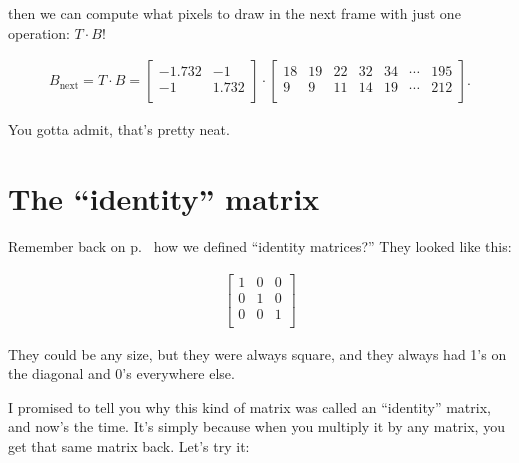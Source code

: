 then we can compute what pixels to draw in the next frame with just one
operation: $T \cdot B$!

\vspace{-.15in}
\begin{align*}
B_{\text{next}} = T \cdot B =
\begin{bmatrix}
-1.732 & -1 \\
-1 & 1.732 \\
\end{bmatrix} \cdot
\begin{bmatrix}
18 & 19 & 22 & 32 & 34 & \cdots & 195 \\
9 & 9 & 11 & 14 & 19 & \cdots & 212 \\
\end{bmatrix}.
\end{align*}
\vspace{-.15in}

You gotta admit, that's pretty neat.


\pagebreak

\section{The ``identity'' matrix}

\label{identityMatrixExplanation}

Remember back on p.~\pageref{identityMatrix} how we defined ``identity
matrices?'' They looked like this:

\vspace{-.15in}
\begin{align*}
\begin{bmatrix}
1 & 0 & 0 \\
0 & 1 & 0 \\
0 & 0 & 1 \\
\end{bmatrix}
\end{align*}
\vspace{-.15in}

They could be any size, but they were always square, and they always had 1's on
the diagonal and 0's everywhere else.

I promised to tell you why this kind of matrix was called an ``identity''
matrix, and now's the time. It's simply because when you multiply it by any
matrix, you get that same matrix back. Let's try it:

